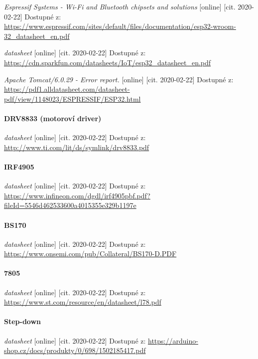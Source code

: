 \documentclass{template/socthesis}
\begin{document}
\begin{thebibliography}{1}
	\textit{Espressif Systems - Wi-Fi and Bluetooth chipsets and solutions } [online] [cit. 2020-02-22] Dostupné z:
	\url{https://www.espressif.com/sites/default/files/documentation/esp32-wroom-32_datasheet_en.pdf}
	
	\textit{datasheet} [online] [cit. 2020-02-22] Dostupné z:
	\url{https://cdn.sparkfun.com/datasheets/IoT/esp32_datasheet_en.pdf}
	
	\textit{Apache Tomcat/6.0.29 - Error report.} [online] [cit. 2020-02-22] Dostupné z:
	\url{https://pdf1.alldatasheet.com/datasheet-pdf/view/1148023/ESPRESSIF/ESP32.html}
	
	\paragraph*{DRV8833 (motoroví driver)}
	
	\textit{datasheet} [online] [cit. 2020-02-22] Dostupné z:
	\url{http://www.ti.com/lit/ds/symlink/drv8833.pdf}
	
	\paragraph*{IRF4905}
	
	\textit{datasheet} [online] [cit. 2020-02-22] Dostupné z:
	\url{https://www.infineon.com/dgdl/irf4905pbf.pdf?fileId=5546d462533600a4015355e329b1197e}
	
	\paragraph*{BS170}
	
	\textit{datasheet} [online] [cit. 2020-02-22] Dostupné z:
	\url{https://www.onsemi.com/pub/Collateral/BS170-D.PDF}
	
	\paragraph*{7805}
	
	\textit{datasheet} [online] [cit. 2020-02-22] Dostupné z:
	\url{https://www.st.com/resource/en/datasheet/l78.pdf}
	
	\paragraph*{Step-down}
	
	\textit{datasheet} [online] [cit. 2020-02-22] Dostupné z:
	\url{https://arduino-shop.cz/docs/produkty/0/698/1502185417.pdf}
	

\end{thebibliography}
\end{document}
